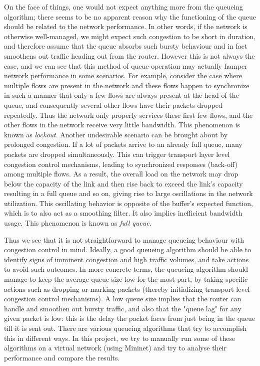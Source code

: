 \documentclass[paper=letter, fontsize=13pt]{article}
\begin{document}
On the face of things, one would not expect anything more from the queueing algorithm; there seems to be no apparent reason why the functioning of the queue should be related to the network performance. In other words, if the network is otherwise well-managed, we might expect such congestion to be short in duration, and therefore assume that the queue absorbs such bursty behaviour and in fact smoothens out traffic heading out from the router. However this is not always the case, and we can see that this method of queue operation may actually hamper network performance in some scenarios. For example, consider the case where multiple flows are present in the network and these flows happen to synchronize in such a manner that only a few flows are always present at the head of the queue, and consequently several other flows have their packets dropped repeatedly. Thus the network only properly services these first few flows, and the other flows in the network receive very little bandwidth. This phenomenon is known as \textit{lockout}. Another undesirable scenario can be brought about by prolonged congestion. If a lot of packets arrive to an already full queue, many packets are dropped simultaneously. This can trigger transport layer level congestion control mechanisms, leading to synchronized responses (back-off) among multiple flows. As a result, the overall load on the network may drop below the capacity of the link and then rise back to exceed the link's capacity resulting in a full queue and so on, giving rise to large oscillations in the network utilization. This oscillating behavior is opposite of the buffer's expected function, which is to also act as a smoothing filter. It also implies inefficient bandwidth usage. This phenomenon is known as \textit{full queue}.

Thus we see that it is not straightforward to manage queueing behaviour with congestion control in mind. Ideally, a good queueing algorithm should be able to identify signs of imminent congestion and high traffic volumes, and take actions to avoid such outcomes. In more concrete terms, the queueing algorithm should manage to keep the average queue size low for the most part, by taking specific actions such as dropping or marking packets (thereby initializing transport level congestion control mechanisms). A low queue size implies that the router can handle and smoothen out bursty traffic, and also that the "queue lag" for any given packet is low: this is the delay the packet faces from just being in the queue till it is sent out. There are various queueing algorithms that try to accomplish this in different ways. In this project, we try to manually run some of these algorithms on a virtual network (using Mininet) and try to analyse their performance and compare the results.
\end{document}
